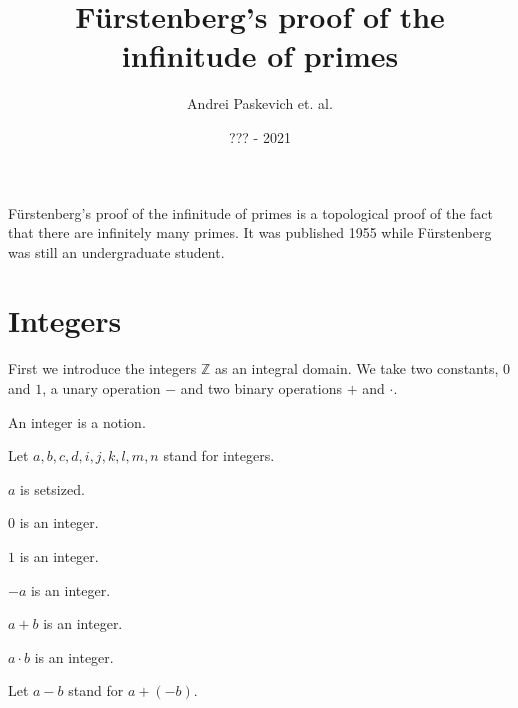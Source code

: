\documentclass{article}
\title{Fürstenberg's proof of the infinitude of primes}
\author{Andrei Paskevich et. al.}
\date{??? - 2021}
\newcommand{\Int}{\mathbb{Z}}
\begin{document}
  \maketitle

  Fürstenberg's proof of the infinitude of primes is a topological proof of the fact that there are infinitely many primes. It was published 1955 while Fürstenberg was still an undergraduate student.

  \section{Integers}

  First we introduce the integers $\Int$ as an integral domain. We take two constants, $0$ and $1$, a unary operation $-$ and two binary operations $+$ and $\cdot$.

  \begin{forthel}

    \begin{signature}[Integers]
      An integer is a notion.
    \end{signature}

    Let $a,b,c,d,i,j,k,l,m,n$ stand for integers.

    \begin{axiom}
      $a$ is setsized.
    \end{axiom}

    \begin{signature}[IntZero]
      $0$ is an integer.
    \end{signature}

    \begin{signature}[IntOne]
      $1$ is an integer.
    \end{signature}

    \begin{signature}[IntNeg]
      $-a$ is an integer.
    \end{signature}

    \begin{signature}[IntPlus]
      $a + b$ is an integer.
    \end{signature}

    \begin{signature}[IntMult]
      $a \cdot b$ is an integer.
    \end{signature}

    Let $a - b$ stand for $a + (-b)$.
  \end{forthel}
\end{document}
